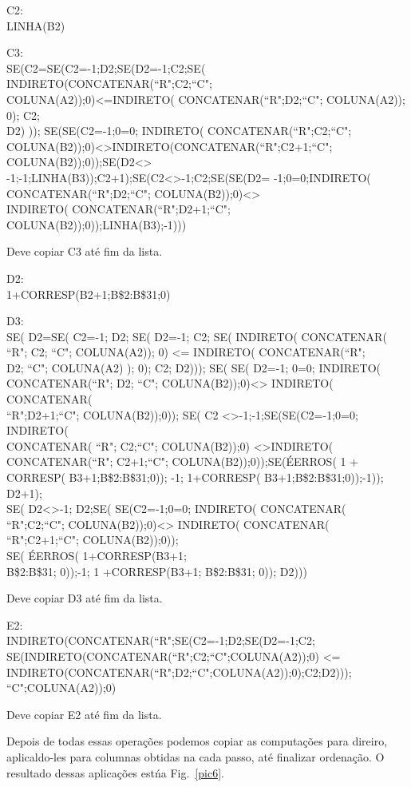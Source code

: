 \documentclass[12pt]{article}
\begin{document}
C2:\\
LINHA(B2)

C3:\\
SE(C2=SE(C2=-1;D2;SE(D2=-1;C2;SE( INDIRETO(CONCATENAR(``R";C2;``C";\\
COLUNA(A2));0)\textless=INDIRETO( CONCATENAR(``R";D2;``C";
COLUNA(A2)); 0); C2;\\
D2) )); SE(SE(C2=-1;0=0; INDIRETO(
 CONCATENAR(``R";C2;``C";\\
 COLUNA(B2));0)\textless\textgreater INDIRETO(CONCATENAR(``R";C2+1;``C";
COLUNA(B2));0));SE(D2\textless\textgreater
-1;-1;LINHA(B3));C2+1);SE(C2\textless\textgreater -1;C2;SE(SE(D2=
-1;0=0;INDIRETO( CONCATENAR(``R";D2;``C";
COLUNA(B2));0)\textless\textgreater\\
INDIRETO( CONCATENAR(``R";D2+1;``C";
COLUNA(B2));0));LINHA(B3);-1)))

Deve copiar C3 at\'e fim da lista.

D2:\\
1+CORRESP(B2+1;B\$2:B\$31;0)

D3:\\
{SE}( D2={SE}( C2=-1; D2; SE( D2=-1; C2; SE(
{INDIRETO}( {CONCATENAR}(\\
``R"; C2; ``C"; \mbox{{COLUNA}}(A2)); 0) \textless=
{INDIRETO}( {CONCATENAR}(``R";\\
D2; ``C"; \mbox{{COLUNA}}(A2) ); 0); C2; D2))); SE( SE(
D2=-1; 0=0; {INDIRETO}(\\
{CONCATENAR}(``R"; D2; ``C";
\mbox{{COLUNA}}(B2));0)\textless\textgreater
{INDIRETO}( {CONCATENAR}(\\
``R";D2+1;``C"; \mbox{{COLUNA}}(B2));0)); SE( C2
\textless\textgreater -1;-1;SE(SE(C2=-1;0=0; {INDIRETO}(\\
{CONCATENAR}( ``R"; C2;``C"; \mbox{{COLUNA}}(B2));0)
\textless\textgreater {INDIRETO}(\\
{CONCATENAR}(``R"; C2+1;``C";
\mbox{{COLUNA}}(B2));0));SE({\'EERROS}( 1
+\\
{CORRESP}( B3+1;B\$2:B\$31;0)); -1; 1+{CORRESP}(
B3+1;B\$2:B\$31;0));-1)); D2+1);\\
SE( D2\textless\textgreater -1; D2;SE( SE(C2=-1;0=0;
{INDIRETO}( {CONCATENAR}(\\
``R";C2;``C"; {COLUNA}(B2));0)\textless\textgreater
{INDIRETO}( {CONCATENAR}(\\
``R";C2+1;``C"; {COLUNA}(B2));0));\\
{SE}( {\'EERROS}( 1+{CORRESP}(B3+1;\\
B\$2:B\$31; 0));-1; 1 +{CORRESP}(B3+1; B\$2:B\$31; 0)); D2)))


Deve copiar D3 at\'e fim da lista.

E2:\\
INDIRETO(CONCATENAR(``R";SE(C2=-1;D2;SE(D2=-1;C2;
SE(INDIRETO(CONCATENAR(``R";C2;``C";COLUNA(A2));0)
\textless=\\
INDIRETO(CONCATENAR(``R";D2;``C";COLUNA(A2));0);C2;D2)));\\
``C";COLUNA(A2));0)

Deve copiar E2 at\'e fim da lista.

Depois de todas essas opera\c{c}\~oes podemos copiar as
computa\c{c}\~oes para direiro, aplicaldo-les para columnas
obtidas na cada passo, at\'e finalizar ordena\c{c}\~ao. O
resultado dessas aplica\c{c}\~oes est\' na Fig.~\ref{pic6}.
\end{document}
